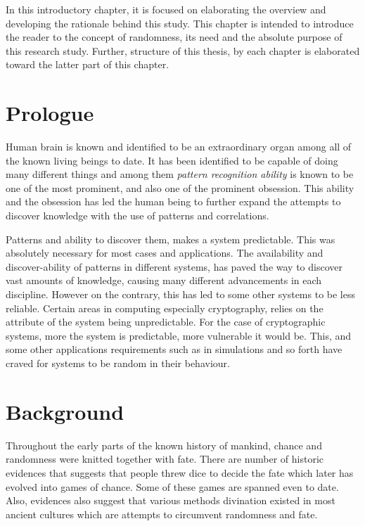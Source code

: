 In this introductory chapter, it is focused on elaborating the overview and developing the rationale behind this study. This chapter is intended to introduce the reader to the concept of randomness, its need and the absolute purpose of this research study. Further, structure of this thesis, by each chapter is elaborated toward the latter part of this chapter.

\section{Prologue}

Human brain is known and identified to be an extraordinary organ among all of the known living beings to date. It has been identified to be capable of doing many different things and among them \textit{pattern recognition ability} is known to be one of the most prominent, and also one of the prominent obsession. This ability and the obsession has led the human being to further expand the attempts to discover knowledge with the use of patterns and correlations.

Patterns and ability to discover them, makes a system predictable. This was absolutely necessary for most cases and applications. The availability and discover-ability of patterns in different systems, has paved the way to discover vast amounts of knowledge, causing many different advancements in each discipline.  However on the contrary, this has led to some other systems to be less reliable. Certain areas in computing especially cryptography, relies on the attribute of the system being unpredictable. For the case of cryptographic systems, more the system is predictable, more vulnerable it would be. This, and some other applications requirements such as in simulations and so forth have craved for systems to be random in their behaviour.

\section{Background}

Throughout the early parts of the known history of mankind, chance and randomness were knitted together with fate. There are number of historic evidences that suggests that people threw dice to decide the fate which later has evolved into games of chance. Some of these games are spanned even to date. Also, evidences also suggest that various methods divination existed in most ancient cultures which are attempts to circumvent randomness and fate.

